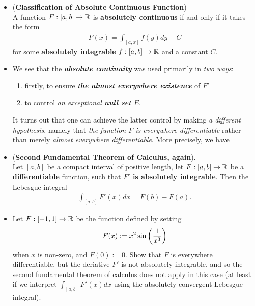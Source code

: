 \documentclass[11pt]{article}
\begin{document}
\begin{itemize}
\item \begin{proposition} (\textbf{Classification of Absolute Continuous Function})\\
A function $F: [a, b] \rightarrow {\mathbb R}$ is \textbf{absolutely continuous} if and only if it takes the form 
\begin{align*}
F(x) = \int_{[a,x]} f(y) dy + C
\end{align*} for some \textbf{absolutely integrable} $f: [a, b] \rightarrow {\mathbb R}$ and a constant $C$.
\end{proposition}

\item \begin{remark}
We see that the \emph{\textbf{absolute continuity}} was used primarily in \emph{two ways}: 
\begin{enumerate}
\item firstly, to ensure \emph{\textbf{the almost everywhere existence}} of $F'$
\item to control \emph{an exceptional \textbf{null set} $E$}.
\end{enumerate}
It turns out that one can achieve the latter control by making \emph{a different hypothesis}, namely that \emph{the function $F$ is everywhere differentiable} rather than merely \emph{almost everywhere differentiable}. More
precisely, we have
\end{remark}

\item \begin{theorem} (\textbf{Second Fundamental Theorem of Calculus, again}).\\
Let $[a, b]$ be a compact interval of positive length, let $F: [a, b] \rightarrow {\mathbb R}$ be a \textbf{differentiable} function, such that \textbf{$F'$ is absolutely integrable}. Then the Lebesgue integral 
\begin{align*}
\int_{[a, b]}F'(x) dx = F(b) - F(a).
\end{align*}
\end{theorem}

\item \begin{exercise}
Let $F: [-1, 1] \rightarrow {\mathbb R}$ be the function defined by setting 
\begin{align*}
F(x) := x^2 \sin\left(\frac{1}{x^3}\right) 
\end{align*} when $x$ is non-zero, and $F(0) := 0$. Show that $F$ is everywhere differentiable, but the deriative $F'$ is not absolutely integrable, and so the second fundamental theorem of calculus does not apply in this case (at least if we interpret $\int_{[a,b]} F'(x) dx$ using the absolutely convergent Lebesgue integral). 
\end{exercise}
\end{itemize}

\newpage


\end{document}
